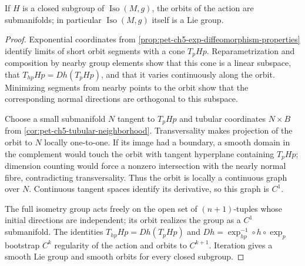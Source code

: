 \begin{theorem}
  \label{thm:pet-ch5-myers-steenrod-lie-group}

  If $H$ is a closed subgroup of $\operatorname{Iso}(M,g)$, the orbits of the
  action are submanifolds; in particular $\operatorname{Iso}(M,g)$ itself is a Lie
  group.
\end{theorem}
\begin{proof}
  \sketch
  Exponential coordinates from
  \cref{prop:pet-ch5-exp-diffeomorphism-properties} identify limits of short orbit
  segments with a cone $T_pHp$.  Reparametrization and composition by nearby group
  elements show that this cone is a linear subspace, that
  $T_{hp}Hp=Dh(T_pHp)$, and that it varies continuously along the orbit.
  Minimizing segments from nearby points to the orbit show that the corresponding
  normal directions are orthogonal to this subspace.

  Choose a small submanifold $N$ tangent to $T_pHp$ and tubular coordinates
  $N\times B$ from \cref{cor:pet-ch5-tubular-neighborhood}.  Transversality makes
  projection of the orbit to $N$ locally one-to-one.  If its image had a boundary,
  a smooth domain in the complement would touch the orbit with tangent hyperplane
  containing $T_pHp$; dimension counting would force a nonzero intersection with
  the nearly normal fibre, contradicting transversality.  Thus the orbit is locally
  a continuous graph over $N$.  Continuous tangent spaces identify its derivative,
  so this graph is $C^1$.

  The full isometry group acts freely on the open set of $(n+1)$-tuples whose
  initial directions are independent; its orbit realizes the group as a $C^1$
  submanifold.  The identities $T_{hp}Hp=Dh(T_pHp)$ and
  $Dh=\exp_{hp}^{-1}\circ h\circ\exp_p$ bootstrap $C^k$ regularity of the action and
  orbits to $C^{k+1}$.  Iteration gives a smooth Lie group and smooth orbits for
  every closed subgroup.
\end{proof}

